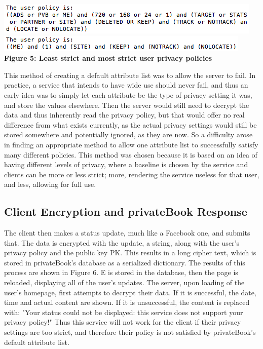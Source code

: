 \documentclass[12pt]{article}
\begin{document}
\begin{center}
\includegraphics[scale=.8]{policy.png} \\
\includegraphics[scale=.85]{policy2.png} \\
\textbf{Figure 5: Least strict and most strict user privacy policies}
\end{center}
This method of creating a default attribute list was to allow the server to fail. In practice, a service that intends to have wide use should never fail, and thus an early idea was to simply let each attribute be the type of privacy setting it was, and store the values elsewhere. Then the server would still need to decrypt the data and thus inherently read the privacy policy, but that would offer no real difference from what exists currently, as the actual privacy settings would still be stored somewhere and potentially ignored, as they are now. So a difficulty arose in finding an appropriate method to allow one attribute list to successfully satisfy many different policies. This method was chosen because it is based on an idea of having different levels of privacy, where a baseline is chosen by the service and clients can be more or less strict; more, rendering the service useless for that user, and less, allowing for full use.

\subsection{Client Encryption and privateBook Response}
The client then makes a status update, much like a Facebook one, and submits that. The data is encrypted with the update, a string, along with the user's privacy policy and the public key PK. This results in a long cipher text, which is stored in privateBook's database as a serialized dictionary. The results of this process are shown in Figure 6. E is stored in the database, then the page is reloaded, displaying all of the user's updates. The server, upon loading of the user's homepage, first attempts to decrypt their data. If it is successful, the date, time and actual content are shown. If it is unsuccessful, the content is replaced with: "Your status could not be displayed: this service does not support your privacy policy!" Thus this service will not work for the client if their privacy settings are too strict, and therefore their policy is not satisfied by privateBook's default attribute list. 
\end{document}
